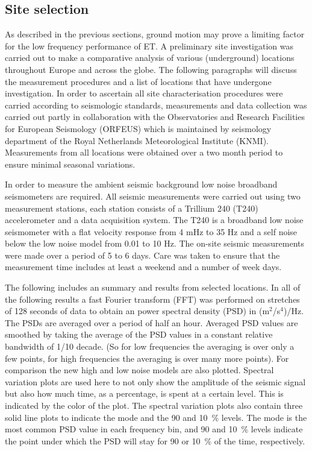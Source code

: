 \FloatBarrier
\subsection{Site selection}
\label{SiteInvestigation}
As described in the previous sections, ground motion may prove a limiting factor for the low frequency performance of ET. A preliminary site investigation was carried out to make a comparative analysis of various (underground) locations throughout Europe and across the globe. The following paragraphs will discuss the measurement procedures and a list of locations that have undergone investigation. In order to ascertain all site characterisation procedures were carried according to seismologic standards, measurements and data collection was carried out partly in collaboration with the Observatories and Research Facilities for European Seismology (ORFEUS) which is maintained by seismology department of the Royal Netherlands Meteorological Institute (KNMI). Measurements from all locations were obtained over a two month period to ensure minimal seasonal variations. 

In order to measure the ambient seismic background low noise broadband seismometers are required. All seismic measurements were carried out using two measurement stations, each station consists of a Trillium 240 (T240) accelerometer and a data acquisition system. The T240 is a broadband low noise seismometer with a flat velocity response from 4 mHz to 35 Hz and a self noise below the low noise model from 0.01 to 10 Hz. The on-site seismic measurements were made over a period of 5 to 6 days. Care was taken to ensure that the measurement time includes at least a weekend and a number of week days. 

The following includes an summary and results from selected locations. In all of the following results a fast Fourier transform (FFT) was performed on stretches of 128 seconds of data to obtain an power spectral density (PSD) in (m$^2$/s$^4$)/Hz. The PSDs are averaged over a period of half an hour. Averaged PSD values are smoothed by taking the average of the PSD values in a constant relative bandwidth of 1/10 decade. (So for low frequencies the averaging is over only a few points, for high frequencies the averaging is over many more points). For comparison the new high and low noise models are also plotted. Spectral variation plots are used here to not only show the amplitude of the seismic signal but also how much time, as a percentage, is spent at a certain level. This is indicated by the color of the plot. The spectral variation plots also contain three solid line plots to indicate the mode and the 90 and 10~\% levels. The mode is the most common PSD value in each frequency bin, and 90 and 10~\% levels indicate the point under which the PSD will stay for 90 or 10~\% of the time, respectively. 

